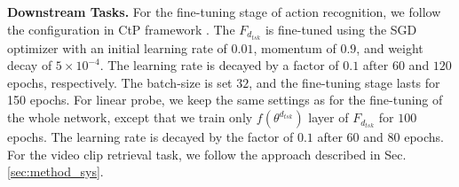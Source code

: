 \noindent \textbf{Downstream Tasks.} For the fine-tuning stage of action recognition, we follow the configuration in CtP framework \cite{wang2021unsupervised}. The $F_{d_{tsk}}$ is fine-tuned using the SGD optimizer with an initial learning rate of $0.01$, momentum of $0.9$, and weight decay of $5\times10^{-4}$. The learning rate is decayed by a factor of $0.1$ after $60$ and $120$ epochs, respectively. The batch-size is set $32$, and the fine-tuning stage lasts for 150 epochs. For linear probe, we keep the same settings as for the fine-tuning of the whole network, except that we train only $f(\theta^{d_{tsk}})$ layer of $F_{d_{tsk}}$ for $100$ epochs. The learning rate is decayed by the factor of $0.1$ after $60$ and $80$ epochs. For the video clip retrieval task, we follow the approach described in Sec. \ref{sec:method_sys}.

